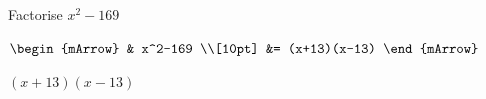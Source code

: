 \begin{mtask}
   \task \begin{exercise} Factorise $x^2-169$\\
             \begin{envSolution}
			      
			      $\begin{mArrow}
			        &   x^2-169                        \\[10pt]  
                    &= (x+13)(x-13)					
				 \end{mArrow}$
                 \begin{shortsolution}  
				       $(x+13)(x-13)	$
			     \end{shortsolution}				 
               \end{envSolution}
         \end{exercise}
\end{mtask}

